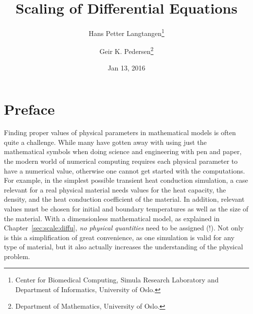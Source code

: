 \documentclass[graybox,envcountchap,sectrefs,final]{svmonodo}
\begin{document}







\frontmatter
\setcounter{page}{3}
\pagestyle{headings}



\title{Scaling of Differential Equations}


\author{Hans Petter Langtangen\footnote{Center for Biomedical Computing, Simula Research Laboratory and Department of Informatics, University of Oslo.}
\and Geir K. Pedersen\footnote{Department of Mathematics, University of Oslo.}}


\date{Jan 13, 2016}
\maketitle


\chapter*{Preface}
\label{ch:preface}

Finding proper values of physical parameters in mathematical models is
often quite a challenge. While many have gotten away with using just
the mathematical symbols when doing science and engineering with pen
and paper, the modern world of numerical computing requires each
physical parameter to have a numerical value, otherwise one cannot get
started with the computations.  For example, in the simplest possible
transient heat conduction simulation, a case relevant for a real
physical material needs values for the heat capacity, the density, and
the heat conduction coefficient of the material. In addition, relevant
values must be chosen for initial and boundary temperatures as well as
the size of the material.  With a dimensionless mathematical model, as
explained in Chapter~\ref{sec:scale:diffu}, \emph{no physical quantities}
need to be assigned (!). Not only is this a simplification of great
convenience, as one simulation is valid for any type of material, but
it also actually increases the understanding of the physical problem.
\end{document}
